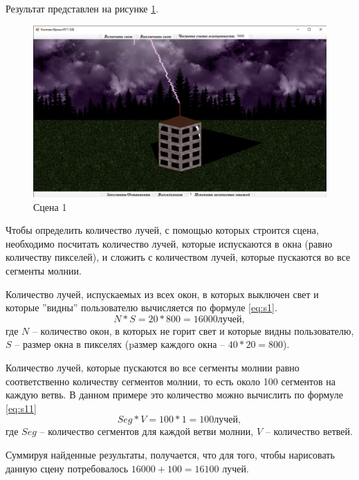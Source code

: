 Результат представлен на рисунке \ref{img:s1}.
\begin{figure}[H]
	\begin{center}
		\includegraphics[scale=0.40]{img/prog_res/s1.png}
	\end{center}
	\captionsetup{justification=centering}
	\caption{Сцена 1}
	\label{img:s1}
\end{figure}

Чтобы определить количество лучей, с помощью которых строится сцена, необходимо посчитать количество лучей, которые испускаются в окна (равно количеству пикселей), и сложить с количеством лучей, которые пускаются во все сегменты молнии.

Количество лучей, испускаемых из всех окон, в которых выключен свет и которые ''видны'' пользователю вычисляется по формуле \ref{eq:s1}.
\begin{equation}
	\label{eq:s1}
	N * S =  20 * 800 = 16 000 лучей,
\end{equation}
где $N$ -- количество окон, в которых не горит свет и которые видны пользователю, $S$ -- размер окна в пикселях (pазмер каждого окна -- $40 * 20 = 800$).

Количество лучей, которые пускаются во все сегменты молнии равно соответственно количеству сегментов молнии, то есть около 100 сегментов на каждую ветвь. В данном примере это количество можно вычислить по формуле \ref{eq:s11}
\begin{equation}
	\label{eq:s11}
	Seg * V = 100 * 1 = 100 лучей,
\end{equation}
где $Seg$ -- количество сегментов для каждой ветви молнии, $V$ -- количество ветвей.

Суммируя найденные результаты, получается, что для того, чтобы нарисовать данную сцену потребовалось $16 000 + 100 = 16 100$ лучей.

